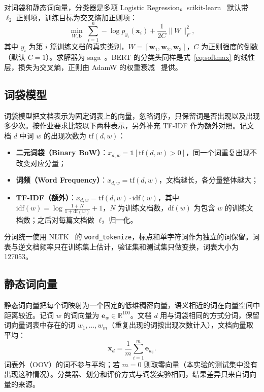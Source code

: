 \documentclass[lang=cn,a4paper]{elegantpaper}
\begin{document}
对词袋和静态词向量，分类器是多项 Logistic Regression。scikit-learn~\cite{pedregosa2011sklearn} 默认带 $\ell_2$ 正则项，训练目标为交叉熵加正则项：
\begin{equation}
\label{eq:lr}
\min_{W,\mathbf{b}}\;\sum_{i=1}^{n}-\log p_{y_i}(\mathbf{x}_i)+\frac{1}{2C}\lVert W\rVert_F^{2},
\end{equation}
其中 $y_i$ 为第 $i$ 篇训练文档的真实类别，$W=[\mathbf{w}_1,\mathbf{w}_2,\mathbf{w}_3]$，$C$ 为正则强度的倒数（默认 $C=1$）。求解器为 saga~\cite{defazio2014saga}。BERT 的分类头同样是式~\eqref{eq:softmax} 的线性层，损失为交叉熵，正则由 AdamW 的权重衰减~\cite{loshchilov2019adamw} 提供。

\subsection{词袋模型}

词袋模型把文档表示为固定词表上的向量，忽略词序，只保留词是否出现以及出现多少次。按作业要求比较以下两种表示，另外补充 TF-IDF 作为额外对照。记文档 $d$ 中词 $w$ 的出现次数为 $\mathrm{tf}(d,w)$：
\begin{itemize}
  \item \textbf{二元词袋（Binary BoW）}：$x_{d,w}=\mathbb{1}[\mathrm{tf}(d,w)>0]$，同一个词重复出现不改变对应分量；
  \item \textbf{词频（Word Frequency）}：$x_{d,w}=\mathrm{tf}(d,w)$，文档越长，各分量整体越大；
  \item \textbf{TF-IDF（额外）}：$x_{d,w}=\mathrm{tf}(d,w)\cdot\mathrm{idf}(w)$，其中 $\mathrm{idf}(w)=\log\frac{1+N}{1+\mathrm{df}(w)}+1$，$N$ 为训练文档数，$\mathrm{df}(w)$ 为包含 $w$ 的训练文档数；之后对每篇文档做 $\ell_2$ 归一化。
\end{itemize}
分词统一使用 NLTK~\cite{bird2009nltk} 的 \texttt{word\_tokenize}，标点和单字符词作为独立的词保留。词表与逆文档频率只在训练集上估计，验证集和测试集只做变换，词表大小为 127053。

\subsection{静态词向量}

静态词向量把每个词映射为一个固定的低维稠密向量，语义相近的词在向量空间中距离较近。记词 $w$ 的词向量为 $\mathbf{e}_w\in\mathbb{R}^{100}$。文档 $d$ 用与词袋相同的方式分词，保留词向量词表中存在的词 $w_1,\ldots,w_m$（重复出现的词按出现次数计入），文档向量取平均：
\begin{equation}
\mathbf{x}_d=\frac{1}{m}\sum_{i=1}^{m}\mathbf{e}_{w_i}.
\end{equation}
词表外（OOV）的词不参与平均；若 $m=0$ 则取零向量（本实验的测试集中没有出现这种情况）。分类器、划分和评价方式与词袋实验相同，结果差异只来自词向量的来源。
\end{document}
